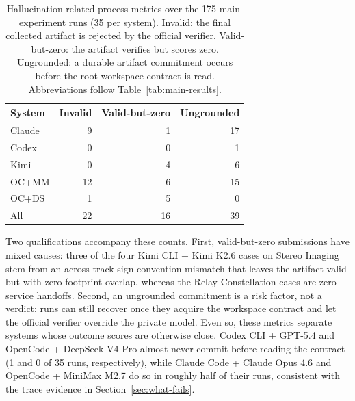 \documentclass[11pt]{article}
\begin{document}
\begin{table}[h]
\centering
\footnotesize
\begin{tabular}{lrrr}
\hline
System & Invalid & Valid-but-zero & Ungrounded \\
\hline
Claude & 9 & 1 & 17 \\
Codex & 0 & 0 & 1 \\
Kimi & 0 & 4 & 6 \\
OC+MM & 12 & 6 & 15 \\
OC+DS & 1 & 5 & 0 \\
\hline
All & 22 & 16 & 39 \\
\hline
\end{tabular}
\caption{Hallucination-related process metrics over the 175 main-experiment runs (35 per system). Invalid: the final collected artifact is rejected by the official verifier. Valid-but-zero: the artifact verifies but scores zero. Ungrounded: a durable artifact commitment occurs before the root workspace contract is read. Abbreviations follow Table~\ref{tab:main-results}.}
\label{tab:hallucination-metrics}
\end{table}

Two qualifications accompany these counts. First, valid-but-zero submissions have mixed causes: three of the four Kimi CLI + Kimi K2.6 cases on Stereo Imaging stem from an across-track sign-convention mismatch that leaves the artifact valid but with zero footprint overlap, whereas the Relay Constellation cases are zero-service handoffs. Second, an ungrounded commitment is a risk factor, not a verdict: runs can still recover once they acquire the workspace contract and let the official verifier override the private model. Even so, these metrics separate systems whose outcome scores are otherwise close. Codex CLI + GPT-5.4 and OpenCode + DeepSeek V4 Pro almost never commit before reading the contract (1 and 0 of 35 runs, respectively), while Claude Code + Claude Opus 4.6 and OpenCode + MiniMax M2.7 do so in roughly half of their runs, consistent with the trace evidence in Section~\ref{sec:what-fails}.
\end{document}
